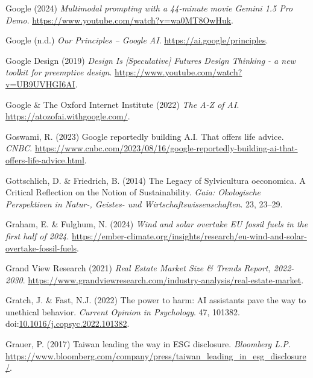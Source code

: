 \documentclass[
  letterpaper,
  DIV=11,
  numbers=noendperiod]{scrartcl}
\newlength{\cslhangindent}
\newenvironment{CSLReferences}[2] %
 {\begin{list}{}{%
  \setlength{\itemindent}{0pt}
  \setlength{\leftmargin}{0pt}
  \setlength{\parsep}{0pt}
  \ifodd #1
   \setlength{\leftmargin}{\cslhangindent}
   \setlength{\itemindent}{-1\cslhangindent}
  \fi
  \setlength{\itemsep}{#2\baselineskip}}}
 {\end{list}}
\begin{document}
\begin{CSLReferences}{0}{1}
Google (2024) \emph{Multimodal prompting with a 44-minute movie
{\textbar} {Gemini} 1.5 {Pro Demo}}.
\url{https://www.youtube.com/watch?v=wa0MT8OwHuk}.

Google (n.d.) \emph{Our {Principles} -- {Google AI}}.
\url{https://ai.google/principles}.

Google Design (2019) \emph{Design {Is} {[}{Speculative}{]} {Futures
Design Thinking} - a new toolkit for preemptive design}.
\url{https://www.youtube.com/watch?v=UB9UVHGI6AI}.

Google \& The Oxford Internet Institute (2022) \emph{The {A-Z} of {AI}}.
\url{https://atozofai.withgoogle.com/}.

Goswami, R. (2023) Google reportedly building {A}.{I}. That offers life
advice. \emph{CNBC}.
\url{https://www.cnbc.com/2023/08/16/google-reportedly-building-ai-that-offers-life-advice.html}.

Gottschlich, D. \& Friedrich, B. (2014) The {Legacy} of {Sylvicultura}
oeconomica. {A Critical Reflection} on the {Notion} of {Sustainability}.
\emph{Gaia: Okologische Perspektiven in Natur-, Geistes- und
Wirtschaftswissenschaften}. 23, 23--29.

Graham, E. \& Fulghum, N. (2024) \emph{Wind and solar overtake {EU}
fossil fuels in the first half of 2024}.
\url{https://ember-climate.org/insights/research/eu-wind-and-solar-overtake-fossil-fuels}.

Grand View Research (2021) \emph{Real {Estate Market Size} \& {Trends
Report}, 2022-2030}.
\url{https://www.grandviewresearch.com/industry-analysis/real-estate-market}.

Gratch, J. \& Fast, N.J. (2022) The power to harm: {AI} assistants pave
the way to unethical behavior. \emph{Current Opinion in Psychology}. 47,
101382.
doi:\href{https://doi.org/10.1016/j.copsyc.2022.101382}{10.1016/j.copsyc.2022.101382}.

Grauer, P. (2017) Taiwan leading the way in {ESG} disclosure.
\emph{Bloomberg L.P.}
\url{https://www.bloomberg.com/company/press/taiwan_leading_in_esg_disclosure/}.


\end{CSLReferences}
\end{document}
